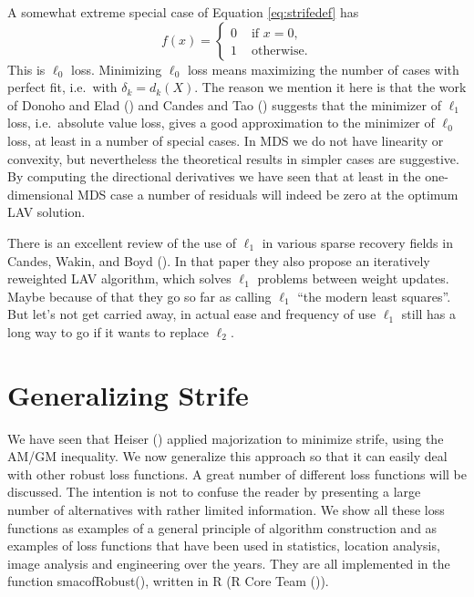 \documentclass[
  12pt,
  letterpaper,
  DIV=11,
  numbers=noendperiod]{scrartcl}
\newcommand{\sectionbreak}{\pagebreak}
\theoremstyle{definition}
\theoremstyle{plain}
\theoremstyle{plain}
\theoremstyle{remark}
\begin{document}
A somewhat extreme special case of Equation \eqref{eq:strifedef} has \[
f(x)=\begin{cases}
0&\text{ if }x = 0,\\
1&\text{ otherwise}.
\end{cases}
\] This is \(\ell_0\) loss. Minimizing \(\ell_0\) loss means maximizing
the number of cases with perfect fit, i.e.~with \(\delta_k=d_k(X)\). The
reason we mention it here is that the work of Donoho and Elad
() and Candes and Tao
() suggests that the minimizer of
\(\ell_1\) loss, i.e.~absolute value loss, gives a good approximation to
the minimizer of \(\ell_0\) loss, at least in a number of special cases.
In MDS we do not have linearity or convexity, but nevertheless the
theoretical results in simpler cases are suggestive. By computing the
directional derivatives we have seen that at least in the
one-dimensional MDS case a number of residuals will indeed be zero at
the optimum LAV solution.

There is an excellent review of the use of \(\ell_1\) in various sparse
recovery fields in Candes, Wakin, and Boyd
(). In that paper they also
propose an iteratively reweighted LAV algorithm, which solves \(\ell_1\)
problems between weight updates. Maybe because of that they go so far as
calling \(\ell_1\) ``the modern least squares''. But let's not get
carried away, in actual ease and frequency of use \(\ell_1\) still has a
long way to go if it wants to replace \(\ell_2\).

\sectionbreak

\section{Generalizing Strife}\label{generalizing-strife}

We have seen that Heiser () applied
majorization to minimize strife, using the AM/GM inequality. We now
generalize this approach so that it can easily deal with other robust
loss functions. A great number of different loss functions will be
discussed. The intention is not to confuse the reader by presenting a
large number of alternatives with rather limited information. We show
all these loss functions as examples of a general principle of algorithm
construction and as examples of loss functions that have been used in
statistics, location analysis, image analysis and engineering over the
years. They are all implemented in the function smacofRobust(), written
in R (R Core Team ()).
\end{document}
